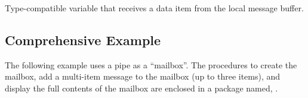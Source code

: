 \documentclass[letterpaper,10pt,english,openany,oneside]{sphinxmanual}
\begin{document}

Type-compatible variable that receives a data item from the local
message buffer.

\newpage

\ignorespaces 

\subsection{Comprehensive Example}
\label{\detokenize{comprehensive_example::doc}}\label{\detokenize{comprehensive_example:comprehensive-example}}\label{\detokenize{comprehensive_example:index-0}}
The following example uses a pipe as a “mailbox”. The procedures to
create the mailbox, add a multi-item message to the mailbox (up to three
items), and display the full contents of the mailbox are enclosed in a
package named, .
\end{document}
